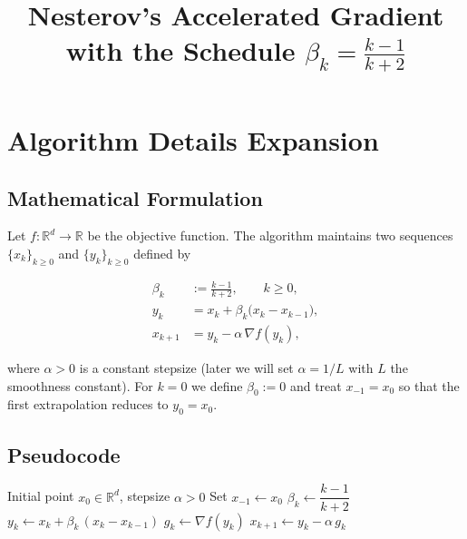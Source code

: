 \documentclass{article}
\begin{document}
\title{Nesterov’s Accelerated Gradient with the Schedule \(\displaystyle \beta_k=\frac{k-1}{k+2}\)}
\author{}
\date{}
\maketitle

\section*{Algorithm Details Expansion}

\subsection*{Mathematical Formulation}
Let \(f:\mathbb{R}^d\rightarrow\mathbb{R}\) be the objective function.  
The algorithm maintains two sequences \(\{x_k\}_{k\ge 0}\) and \(\{y_k\}_{k\ge 0}\) defined by  

\[
\boxed{
\begin{aligned}
\beta_k &:= \frac{k-1}{k+2},\qquad k\ge 0,\\[4pt]
y_k    &= x_k + \beta_k\bigl(x_k-x_{k-1}\bigr), \\[4pt]
x_{k+1} &= y_k - \alpha\,\nabla f(y_k),
\end{aligned}}
\tag{1}
\]

where \(\alpha>0\) is a constant stepsize (later we will set \(\alpha = 1/L\) with \(L\) the smoothness constant).  
For \(k=0\) we define \(\beta_0:=0\) and treat \(x_{-1}=x_0\) so that the first extrapolation reduces to \(y_0=x_0\).

\subsection*{Pseudocode}
\begin{algorithm}[H]
\caption{Accelerated Gradient with \(\beta_k=\frac{k-1}{k+2}\)}
\begin{algorithmic}[1]
\Require Initial point \(x_0\in\mathbb{R}^d\), stepsize \(\alpha>0\)
\State Set \(x_{-1}\gets x_0\)
    \State \(\beta_k \gets \dfrac{k-1}{k+2}\) 
    \State \(y_k \gets x_k + \beta_k\,(x_k-x_{k-1})\) 
    \State \(g_k \gets \nabla f(y_k)\) 
    \State \(x_{k+1} \gets y_k - \alpha\, g_k\) 
\EndFor
\end{algorithmic}
\end{algorithm}
\end{document}
